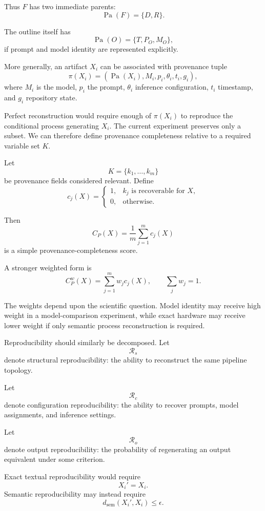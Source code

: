 \documentclass[11pt]{article}
\begin{document}
Thus \(F\) has two immediate parents:
\[
    \operatorname{Pa}(F)=\{D,R\}.
\]

The outline itself has
\[
    \operatorname{Pa}(O)=\{T,P_O,M_O\},
\]
if prompt and model identity are represented explicitly.

More generally, an artifact \(X_i\) can be associated with provenance tuple
\[
    \pi(X_i)
    =
    \left(
        \operatorname{Pa}(X_i),
        M_i,
        p_i,
        \theta_i,
        t_i,
        g_i
    \right),
\]
where \(M_i\) is the model, \(p_i\) the prompt, \(\theta_i\) inference configuration, \(t_i\) timestamp, and \(g_i\) repository state.

Perfect reconstruction would require enough of \(\pi(X_i)\) to reproduce the conditional process generating \(X_i\). The current experiment preserves only a subset. We can therefore define provenance completeness relative to a required variable set \(K\).

Let
\[
    K
    =
    \{k_1,\ldots,k_m\}
\]
be provenance fields considered relevant. Define
\[
    c_j(X)
    =
    \begin{cases}
    1,&k_j\text{ is recoverable for }X,\\
    0,&\text{otherwise}.
    \end{cases}
\]

Then
\[
    C_P(X)
    =
    \frac{1}{m}
    \sum_{j=1}^{m}c_j(X)
\]
is a simple provenance-completeness score.

A stronger weighted form is
\[
    C_P^w(X)
    =
    \sum_{j=1}^{m}w_jc_j(X),
    \qquad
    \sum_jw_j=1.
\]

The weights depend upon the scientific question. Model identity may receive high weight in a model-comparison experiment, while exact hardware may receive lower weight if only semantic process reconstruction is required.

Reproducibility should similarly be decomposed. Let
\[
    \mathcal{R}_s
\]
denote structural reproducibility: the ability to reconstruct the same pipeline topology.

Let
\[
    \mathcal{R}_c
\]
denote configuration reproducibility: the ability to recover prompts, model assignments, and inference settings.

Let
\[
    \mathcal{R}_o
\]
denote output reproducibility: the probability of regenerating an output equivalent under some criterion.

Exact textual reproducibility would require
\[
    X_i'=X_i.
\]
Semantic reproducibility may instead require
\[
    d_{\mathrm{sem}}(X_i',X_i)\leq\epsilon.
\]
\end{document}
